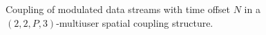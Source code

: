 \documentclass[conference]{IEEEtran}
\begin{document}
\begin{figure}[h!]
\setlength{\abovecaptionskip}{0.cm}
\setlength{\belowcaptionskip}{-0.cm}
  \caption{Coupling of modulated data streams with time offset $N$ in a $\left( {2,2,P,3} \right)$-multiuser spatial coupling structure.}\label{fig.2}
    \vspace{-2em}
\end{figure}
\end{document}
